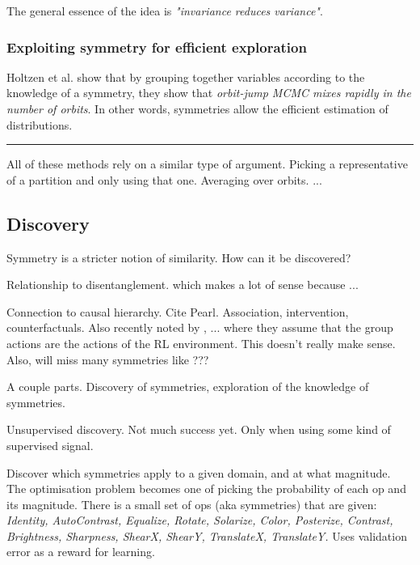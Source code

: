 The general essence of the idea is \textit{"invariance reduces variance"}. \cite{Chen2019}

\subsubsection{Exploiting symmetry for efficient exploration}

Holtzen et al. \cite{Holtzen2019} show that by grouping together variables according to
the knowledge of a symmetry, they show that \textit{orbit-jump MCMC mixes rapidly in the number of orbits}.
In other words, symmetries allow the efficient estimation of distributions.

\begin{center}\rule{0.5\linewidth}{\linethickness}\end{center}

All of these methods rely on a similar type of argument. Picking a representative
of a partition and only using that one. Averaging over orbits. ...

\subsection{Discovery}


Symmetry is a stricter notion of similarity. How can it be discovered?

Relationship to disentanglement. \cite{Higgins2018} which makes a lot of sense because ...

Connection to causal hierarchy. Cite Pearl. Association, intervention, counterfactuals.
Also recently noted by \cite{Caselles-Dupre2019}, ... where they assume that
the group actions are the actions of the RL environment.
This doesn't really make sense. Also, will miss many symmetries like ???

A couple parts. Discovery of symmetries, exploration of the knowledge of symmetries.

Unsupervised discovery. Not much success yet. Only when using some kind of supervised signal.

\cite{Ho2019a, Lim2019, Cubuk2018, Cubuk2019}
Discover which symmetries apply to a given domain, and at what magnitude.
The optimisation problem becomes one of picking the probability of each op and its magnitude.
There is a small set of ops (aka symmetries) that are given:
\textit{Identity, AutoContrast, Equalize, Rotate, Solarize, Color, Posterize, Contrast,
	Brightness, Sharpness, ShearX, ShearY, TranslateX, TranslateY.}
Uses validation error as a reward for learning.


